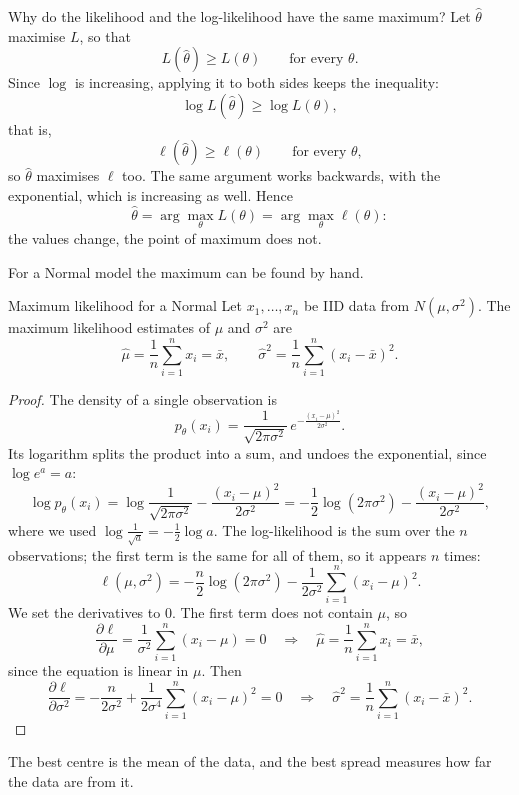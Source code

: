 \documentclass[a4paper,12pt,oneside]{report}
\begin{document}
Why do the likelihood and the log-likelihood have the same maximum? Let
$\hat\theta$ maximise $L$, so that
\[
L(\hat\theta)\ge L(\theta)\qquad\text{for every }\theta .
\]
Since $\log$ is increasing, applying it to both sides keeps the inequality:
\[
\log L(\hat\theta)\ge\log L(\theta),
\]
that is,
\[
\ell(\hat\theta)\ge\ell(\theta)\qquad\text{for every }\theta,
\]
so $\hat\theta$ maximises $\ell$ too. The same argument works backwards, with the exponential,
which is increasing as well. Hence
\[
\hat\theta=\arg\max_{\theta}L(\theta)=\arg\max_{\theta}\ell(\theta):
\]
the values change, the point of maximum does not.

For a Normal model the maximum can be found by hand.

\begin{framedprop}{Maximum likelihood for a Normal}\label{prop:mle-normal}
Let $x_1,\ldots,x_n$ be IID data from $N(\mu,\sigma^2)$. The maximum
likelihood estimates of $\mu$ and $\sigma^2$ are
\[
\hat\mu=\frac1n\sum_{i=1}^n x_i=\bar x,\qquad
\hat\sigma^2=\frac1n\sum_{i=1}^n(x_i-\bar x)^2 .
\]
\end{framedprop}

\begin{proof}
The density of a single observation is
\[
p_\theta(x_i)=\frac{1}{\sqrt{2\pi\sigma^2}}\,e^{-\frac{(x_i-\mu)^2}{2\sigma^2}} .
\]
Its logarithm splits the product into a sum, and undoes the exponential,
since $\log e^{a}=a$:
\[
\log p_\theta(x_i)=\log\frac{1}{\sqrt{2\pi\sigma^2}}-\frac{(x_i-\mu)^2}{2\sigma^2}
=-\frac12\log(2\pi\sigma^2)-\frac{(x_i-\mu)^2}{2\sigma^2},
\]
where we used $\log\frac{1}{\sqrt a}=-\frac12\log a$. The log-likelihood is
the sum over the $n$ observations; the first term is the same for all of
them, so it appears $n$ times:
\[
\ell(\mu,\sigma^2)=-\frac n2\log(2\pi\sigma^2)
-\frac{1}{2\sigma^2}\sum_{i=1}^n(x_i-\mu)^2 .
\]
We set the derivatives to $0$. The first term does not contain $\mu$, so
\[
\frac{\partial\ell}{\partial\mu}=\frac{1}{\sigma^2}\sum_{i=1}^n(x_i-\mu)=0
\quad\Longrightarrow\quad
\hat\mu=\frac1n\sum_{i=1}^n x_i=\bar x ,
\]
since the equation is linear in $\mu$. Then
\[
\frac{\partial\ell}{\partial\sigma^2}=-\frac{n}{2\sigma^2}
+\frac{1}{2\sigma^4}\sum_{i=1}^n(x_i-\mu)^2=0
\quad\Longrightarrow\quad
\hat\sigma^2=\frac1n\sum_{i=1}^n(x_i-\bar x)^2 .
\]
\end{proof}

The best centre is the mean of the data, and the best spread measures how
far the data are from it.
\end{document}
